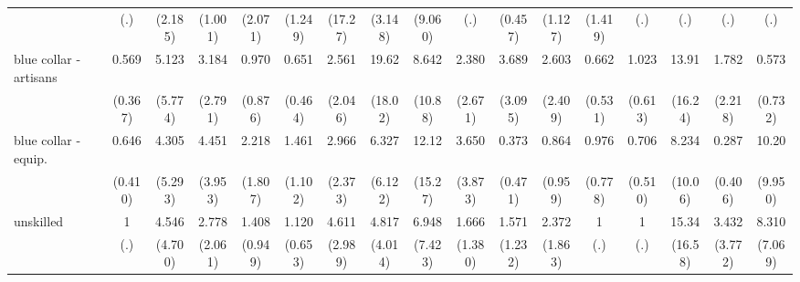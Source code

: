 {\begin{tabular}{l*{16}{c}}
                    &         (.)         &     (2.185)         &     (1.001)         &     (2.071)         &     (1.249)         &     (17.27)         &     (3.148)         &     (9.060)         &         (.)         &     (0.457)         &     (1.127)         &     (1.419)         &         (.)         &         (.)         &         (.)         &         (.)         \\
[1em]
blue collar - artisans&       0.569         &       5.123         &       3.184         &       0.970         &       0.651         &       2.561         &       19.62\sym{**} &       8.642         &       2.380         &       3.689         &       2.603         &       0.662         &       1.023         &       13.91\sym{*}  &       1.782         &       0.573         \\
                    &     (0.367)         &     (5.774)         &     (2.791)         &     (0.876)         &     (0.464)         &     (2.046)         &     (18.02)         &     (10.88)         &     (2.671)         &     (3.095)         &     (2.409)         &     (0.531)         &     (0.613)         &     (16.24)         &     (2.218)         &     (0.732)         \\
[1em]
blue collar - equip.&       0.646         &       4.305         &       4.451         &       2.218         &       1.461         &       2.966         &       6.327         &       12.12\sym{*}  &       3.650         &       0.373         &       0.864         &       0.976         &       0.706         &       8.234         &       0.287         &       10.20\sym{*}  \\
                    &     (0.410)         &     (5.293)         &     (3.953)         &     (1.807)         &     (1.102)         &     (2.373)         &     (6.122)         &     (15.27)         &     (3.873)         &     (0.471)         &     (0.959)         &     (0.778)         &     (0.510)         &     (10.06)         &     (0.406)         &     (9.950)         \\
[1em]
unskilled           &           1         &       4.546         &       2.778         &       1.408         &       1.120         &       4.611\sym{*}  &       4.817         &       6.948         &       1.666         &       1.571         &       2.372         &           1         &           1         &       15.34\sym{*}  &       3.432         &       8.310\sym{*}  \\
                    &         (.)         &     (4.700)         &     (2.061)         &     (0.949)         &     (0.653)         &     (2.989)         &     (4.014)         &     (7.423)         &     (1.380)         &     (1.232)         &     (1.863)         &         (.)         &         (.)         &     (16.58)         &     (3.772)         &     (7.069)         \\

\end{tabular}}
